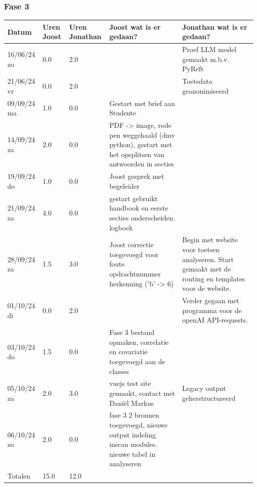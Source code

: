 \documentclass[12pt]{article}
\begin{document}
\subsubsection*{Fase 3}
\footnotesize
\begin{longtable}{@{}p{2.5cm} p{1cm} p{1.5cm} p{5cm} p{5cm}}
\toprule
Datum  & Uren Joost & Uren Jonathan & Joost wat is er gedaan? & Jonathan wat is er gedaan? \\
\hline
\midrule
\endhead
16/06/24 zo & 0.0 & 2.0 &  & Proef LLM model gemaakt m.b.v. PyReft \\
21/06/24 vr & 0.0 & 2.0 &  & Toetsdata geanonimiseerd \\
09/09/24 ma & 1.0 & 0.0 & Gestart met brief aan Studente &  \\
14/09/24 za & 2.0 & 0.0 & PDF -> image, rode pen weggehaald (dmv python), gestart met het opsplitsen van antwoorden in secties &  \\
19/09/24 do & 1.0 & 0.0 & Joost gesprek met begeleider &  \\
21/09/24 za & 4.0 & 0.0 & gestart gebruikt handbook en eerste secties onderscheiden. logboek &  \\
28/09/24 za & 1.5 & 3.0 & Joost correctie toegevoegd voor foute opdrachtnummer herkenning ('b' -> 6) & Begin met website voor toetsen analyseren. Start gemaakt met de routing en templates voor de website. \\
01/10/24 di & 0.0 & 2.0 &  & Verder gegaan met programma voor de openAI API-requests. \\
03/10/24 do & 1.5 & 0.0 & Fase 3 bestand opmaken, correlatie en covariatie toegevoegd aan de classes &  \\
05/10/24 za & 2.0 & 3.0 & vuejs test site gemaakt, contact met Daniël Markus & Legacy output geherstructureerd \\
06/10/24 zo & 2.0 & 0.0 & fase 3 2 bronnen toegevoegd, nieuwe output indeling inscan modules. nieuwe tabel in analyseren &  \\
\midrule
Totalen & 15.0 & 12.0 & & \\
\bottomrule
\end{longtable}
\normalsize
\pagebreak
\end{document}
